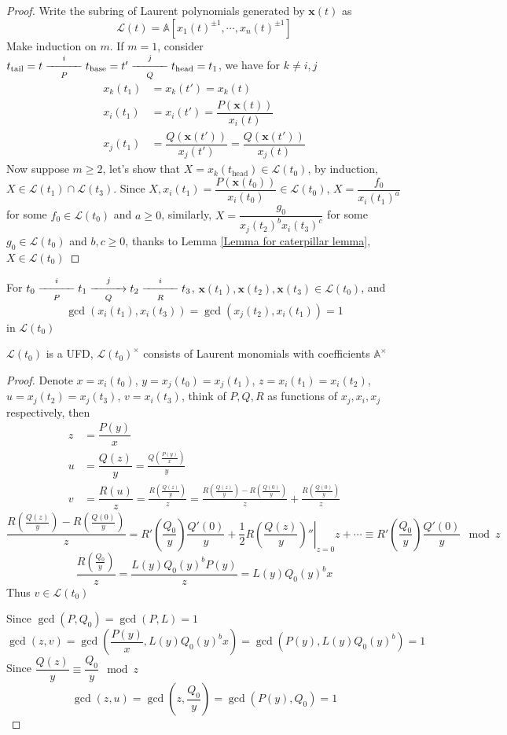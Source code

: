 \documentclass[main]{subfiles}
\begin{document}
\begin{proof}
Write the subring of Laurent polynomials generated by $\mathbf x(t)$ as 
\[\mathcal L(t)=\mathbb A[x_1(t)^{\pm1},\cdots,x_n(t)^{\pm1}]\]
Make induction on $m$. If $m=1$, consider $t_\mathrm{tail}=t\xedge[P]{i}t_\mathrm{base}=t'\xedge[Q]jt_\mathrm{head}=t_1$, we have for $k\neq i,j$
\begin{align*}
x_k(t_1)&=x_k(t')=x_k(t) \\
x_i(t_1)&=x_i(t')=\dfrac{P(\mathbf x(t))}{x_i(t)} \\
x_j(t_1)&=\dfrac{Q(\mathbf x(t'))}{x_j(t')}=\dfrac{Q(\mathbf x(t'))}{x_j(t)} 
\end{align*}
Now suppose $m\geq2$, let's show that $X=x_k(t_\mathrm{head})\in\mathcal L(t_0)$, by induction, $X\in\mathcal L(t_1)\cap\mathcal L(t_3)$. Since $X,x_i(t_1)=\dfrac{P(\mathbf x(t_0))}{x_i(t_0)}\in\mathcal L(t_0)$, $X=\dfrac{f_0}{x_i(t_1)^a}$ for some $f_0\in\mathcal L(t_0)$ and $a\geq0$, similarly, $X=\dfrac{g_0}{x_j(t_2)^bx_i(t_3)^c}$ for some $g_0\in\mathcal L(t_0)$ and $b,c\geq0$, thanks to Lemma \ref{Lemma for caterpillar lemma}, $X\in\mathcal L(t_0)$
\end{proof}

\begin{lemma}\label{Lemma for caterpillar lemma}
For $t_0\xedge[P]{i}t_1\xdirectededge[Q]{j}t_2\xedge[R]{i}t_3$, $\mathbf x(t_1),\mathbf x(t_2),\mathbf x(t_3)\in\mathcal L(t_0)$, and
\[\gcd(x_i(t_1),x_i(t_3))=\gcd(x_j(t_2),x_i(t_1))=1\]
in $\mathcal L(t_0)$
\end{lemma}

\begin{note}
$\mathcal L(t_0)$ is a UFD, $\mathcal L(t_0)^\times$ consists of Laurent monomials with coefficients $\mathbb A^\times$
\end{note}

\begin{proof}
Denote $x=x_i(t_0)$, $y=x_j(t_0)=x_j(t_1)$, $z=x_i(t_1)=x_i(t_2)$, $u=x_j(t_2)=x_j(t_3)$, $v=x_i(t_3)$, think of $P,Q,R$ as functions of $x_j,x_i,x_j$ respectively, then 
\begin{align*}
z&=\dfrac{P(y)}{x} \\
u&=\dfrac{Q(z)}{y}=\frac{Q\left(\frac{P(y)}{x}\right)}{y} \\
v&=\dfrac{R(u)}{z}=\frac{R\left(\frac{Q(z)}{y}\right)}{z}=\frac{R\left(\frac{Q(z)}{y}\right)-R\left(\frac{Q(0)}{y}\right)}{z}+\frac{R\left(\frac{Q(0)}{y}\right)}{z}
\end{align*}
\[\dfrac{R\left(\frac{Q(z)}{y}\right)-R\left(\frac{Q(0)}{y}\right)}{z}=R'\left(\frac{Q_0}{y}\right)\frac{Q'(0)}{y}+\frac{1}{2}\left.R\left(\frac{Q(z)}{y}\right)''\right|_{z=0}z+\cdots\equiv R'\left(\frac{Q_0}{y}\right)\frac{Q'(0)}{y}\mod z\]
\[\frac{R\left(\frac{Q_0}{y}\right)}{z}=\frac{L(y)Q_0(y)^bP(y)}{z}=L(y)Q_0(y)^bx\]
Thus $v\in\mathcal L(t_0)$ \par
Since $\gcd(P,Q_0)=\gcd(P,L)=1$
\[\gcd(z,v)=\gcd\left(\dfrac{P(y)}{x},L(y)Q_0(y)^bx\right)=\gcd\left(P(y),L(y)Q_0(y)^b\right)=1\]
Since $\dfrac{Q(z)}{y}\equiv\dfrac{Q_0}{y}\mod z$
\[\gcd(z,u)=\gcd\left(z,\dfrac{Q_0}{y}\right)=\gcd\left(P(y),Q_0\right)=1\]
\end{proof}
\end{document}
